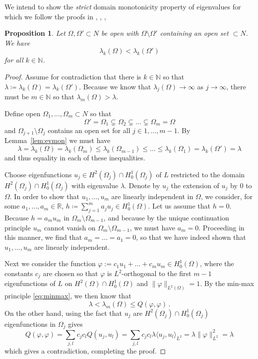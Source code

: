 \documentclass[11pt]{amsart}
\newtheorem{Proposition}[Theorem]{Proposition}
\theoremstyle{definition}
\numberwithin{equation}{section}
\newcommand{\mR}{\mathbb{R}}                    %
\newcommand{\norm}[1]{\lVert #1 \rVert}         %
\begin{document}
We intend to show the \emph{strict} domain monotonicity property of eigenvalues for which we follow the proofs in \cite[Thm.~2.3]{zbMATH03393073}, \cite[Thm.~3.2.1]{zbMATH07759244}, \cite[Thm.~2.21]{zbMATH07819857},
\begin{Proposition}\label{prop:evstrict}
    Let $\Omega,\Omega'\subset N$ be open with $\Omega\setminus \Omega'$ containing an open set $\subset N$. We have
    \[
        \lambda_k(\Omega) < \lambda_k(\Omega')
    \]
    for all $k\in\mathbb{N}$.
\end{Proposition}
\begin{proof}
    Assume for contradiction that there is $k\in \mathbb{N}$ so that $\lambda \coloneqq \lambda_k(\Omega) = \lambda_k(\Omega')$. Because we know that $\lambda_j(\Omega) \to \infty$ as $j\to\infty$, there must be $m\in\mathbb{N}$ so that $\lambda_m(\Omega)> \lambda$. 

    Define open $\Omega_1,\dots, \Omega_m \subset N$ so that
    \[
        \Omega' = \Omega_1 \subsetneq \Omega_2 \subsetneq \dots \subsetneq \Omega_m = \Omega
    \]
    and $\Omega_{j+1}\setminus \Omega_j$ contains an open set for all $j\in 1,\dots,m-1$. By Lemma~\ref{lem:evmon} we must have
    \[
        \lambda = \lambda_k(\Omega) = \lambda_k(\Omega_m) \leq \lambda_k(\Omega_{m-1}) \leq \dots\leq \lambda_k(\Omega_1) = \lambda_k(\Omega') = \lambda
    \]
    and thus equality in each of these inequalities. 

    Choose eigenfunctions $u_j \in H^2(\Omega_j)\cap H^1_0(\Omega_j)$ of $L$ restricted to the domain $H^2(\Omega_j)\cap H^1_0(\Omega_j)$ with eigenvalue $\lambda$. Denote by $u_j$ the extension of $u_j$ by $0$ to $\Omega$. %
    In order to show that $u_1,\dots,u_m$ are linearly independent in $\Omega$, we consider, for some $a_1,\dots,a_m\in \mR$, $h \coloneqq \sum_{j=1}^m a_j u_j \in H^1_0(\Omega)$. Let us assume that $h=0$. Because $h = a_m u_m$ in $\Omega_m \setminus \Omega_{m-1}$, and because by the unique continuation principle $u_m$ cannot vanish on $\Omega_m\setminus \Omega_{m-1}$, we must have $a_m = 0$. Proceeding in this manner, we find that $a_m=\dots=a_1=0$, so that we have indeed shown that $u_1,\dots,u_m$ are linearly independent. %
    
    Next we consider the function $\varphi := c_1 u_1 + \ldots + c_m u_m \in H^1_0(\Omega)$, where the constants $c_j$ are chosen so that $\varphi$ is $L^2$-orthogonal to the first $m-1$ eigenfunctions of $L$ on $H^2(\Omega) \cap H^1_0(\Omega)$ and $\norm{\varphi}_{L^2(\Omega)} = 1$. %
    By the min-max principle \eqref{eq:minmax}, we then know that
    \[
        \lambda < \lambda_m(\Omega) \leq Q(\varphi,\varphi)\,.
    \]
    On the other hand, using the fact that $u_j$ are $H^2(\Omega_j) \cap H^1_0(\Omega_j)$ eigenfunctions in $\Omega_j$ gives  
    \[
        Q(\varphi,\varphi) = \sum_{j,l} c_j c_l Q(u_j, u_l) = \sum_{j,l} c_j c_l \lambda \langle u_j, u_l \rangle_{L^2} = \lambda \norm{\varphi}_{L^2}^2 = \lambda
    \]
    which gives a contradiction, completing the proof.
\end{proof}
\end{document}
